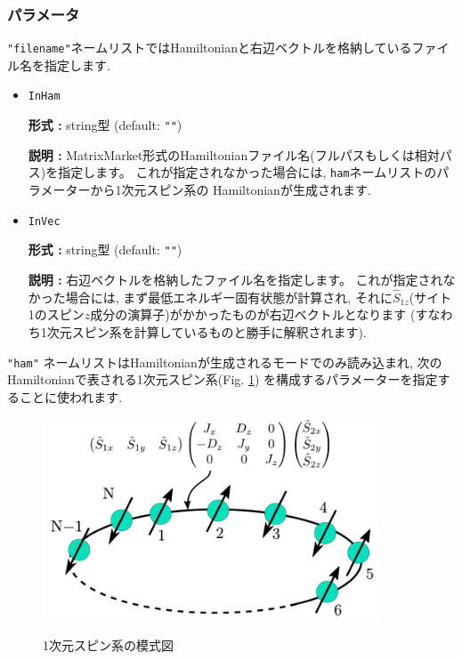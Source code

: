 \documentclass[12pt,titlepage]{jarticle}
\begin{document}
\subsubsection{パラメータ}

\verb|"filename"|ネームリストではHamiltonianと右辺ベクトルを格納しているファイル名を指定します.

\begin{itemize}
\item \verb|InHam|
  
  {\bf 形式 :} string型 (default: \verb|""|)
  
  {\bf 説明 :} MatrixMarket形式のHamiltonianファイル名(フルパスもしくは相対パス)を指定します。
  これが指定されなかった場合には, \verb|ham|ネームリストのパラメーターから1次元スピン系の
  Hamiltonianが生成されます.
  
\item \verb|InVec|
  
  {\bf 形式 :} string型 (default: \verb|""|) 

  {\bf 説明 :} 右辺ベクトルを格納したファイル名を指定します。
  これが指定されなかった場合には, まず最低エネルギー固有状態が計算され,
  それに${\hat S}_{1 z}$(サイト1のスピン$z$成分の演算子)がかかったものが右辺ベクトルとなります
  (すなわち1次元スピン系を計算しているものと勝手に解釈されます).

\end{itemize}

\verb|"ham"| ネームリストはHamiltonianが生成されるモードでのみ読み込まれ,
次のHamiltonianで表される1次元スピン系(Fig. \ref{Fig_spin})
を構成するパラメーターを指定することに使われます.

\begin{figure}[tbp]
  \begin{center}
    \includegraphics[width=10cm]{spin.pdf}
    \label{Fig_spin}
    \caption{1次元スピン系の模式図}
  \end{center}
\end{figure}
\end{document}
